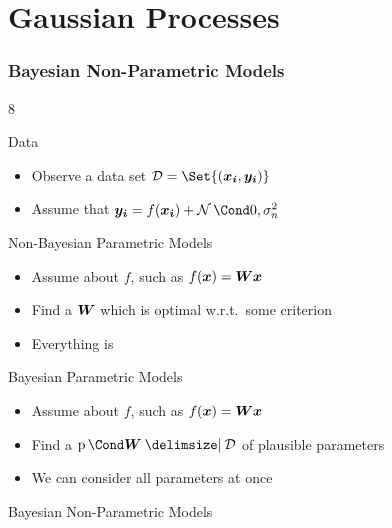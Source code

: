 \section{Gaussian Processes}
\begin{frame}[label=gp_non_parametric_models]
    \frametitle{Bayesian Non-Parametric Models}

    \begin{overlayarea}{\textwidth}{8\baselineskip}
         {
            \begin{block}{Data}
                \begin{itemize}
                    \item Observe a  data set $\D = \Set{\left( \mat{x_i}, \mat{y_i} \right)}$
                    \item Assume that $\mat{y_i} = f(\mat{x_i}) + \Gaussian{0, \sigma_n^2}$
                \end{itemize}
            \end{block}
        }
         {
            \begin{block}{Non-Bayesian Parametric Models}
                \begin{itemize}
                    \item Assume  about $f$, such as $f(\bm{x}) = \bm{W}\bm{x}$
                    \item Find a  $\bm{W}$ which is optimal w.r.t.\ some criterion
                    \item Everything is 
                \end{itemize}
            \end{block}
        }
         {
            \begin{block}{Bayesian Parametric Models}
                \begin{itemize}
                    \item Assume  about $f$, such as $f(\bm{x}) = \bm{W}\bm{x}$
                    \item Find a  $\Prob{\mat{W} \given \D}$ of plausible parameters
                    \item We can consider all parameters at once
                \end{itemize}
            \end{block}
        }
         {
            \begin{block}{Bayesian Non-Parametric Models}

\end{block}}
\end{overlayarea}
\end{frame}
